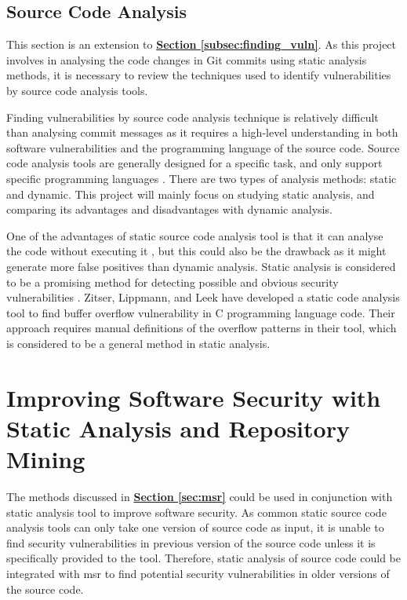 \documentclass[12pt, a4paper]{report}
\begin{document}
\subsection{Source Code Analysis}
This section is an extension to \hyperref[subsec:finding_vuln]{\textbf{Section
\ref*{subsec:finding_vuln}}}. As this project involves in analysing the code changes in Git commits
using static analysis methods, it is necessary to review the techniques used to identify
vulnerabilities by source code analysis tools.

Finding vulnerabilities by source code analysis technique is relatively difficult than analysing
commit messages as it requires a high-level understanding in both software vulnerabilities and the
programming language of the source code. Source code analysis tools are generally designed for a
specific task, and only support specific programming languages \cite{antunes_2009}. There are two
types of analysis methods: static and dynamic. This project will mainly focus on studying static
analysis, and comparing its advantages and disadvantages with dynamic analysis.

One of the advantages of static source code analysis tool is that it can analyse the code without
executing it \cite{livshits_finding_2005}, but this could also be the drawback as it might generate
more false positives than dynamic analysis. Static analysis is considered to be a promising method
for detecting possible and obvious security vulnerabilities \cite{evans_2002}. Zitser, Lippmann, and
Leek \cite{zitser_2004} have developed a static code analysis tool to find buffer overflow
vulnerability in C programming language code. Their approach requires manual definitions of the
overflow patterns in their tool, which is considered to be a general method in static analysis.

\section{Improving Software Security with Static Analysis and Repository Mining}
The methods discussed in \hyperref[sec:msr]{\textbf{Section \ref*{sec:msr}}} could be used in
conjunction with static analysis tool to improve software security. As common static source code
analysis tools can only take one version of source code as input, it is unable to find security
vulnerabilities in previous version of the source code unless it is specifically provided to the
tool. Therefore, static analysis of source code could be integrated with \acrfull{msr} to find
potential security vulnerabilities in older versions of the source code.
\end{document}
